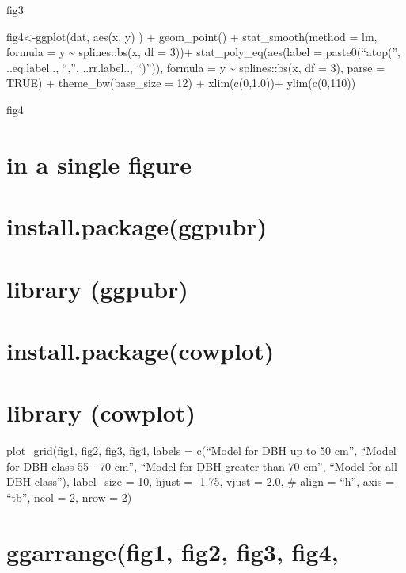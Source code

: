 \documentclass[
]{article}
\begin{document}
fig3

fig4\textless-ggplot(dat, aes(x, y) ) + geom\_point() +
stat\_smooth(method = lm, formula = y \textasciitilde{} splines::bs(x,
df = 3))+ stat\_poly\_eq(aes(label = paste0(``atop('', ..eq.label..,
``,'', ..rr.label.., ``)'')), formula = y \textasciitilde{}
splines::bs(x, df = 3), parse = TRUE) + theme\_bw(base\_size = 12) +
xlim(c(0,1.0))+ ylim(c(0,110))

fig4

\hypertarget{in-a-single-figure}{%
\section{in a single figure}\label{in-a-single-figure}}

\hypertarget{install.packageggpubr}{%
\section{install.package(ggpubr)}\label{install.packageggpubr}}

\hypertarget{library-ggpubr}{%
\section{library (ggpubr)}\label{library-ggpubr}}

\hypertarget{install.packagecowplot}{%
\section{install.package(cowplot)}\label{install.packagecowplot}}

\hypertarget{library-cowplot}{%
\section{library (cowplot)}\label{library-cowplot}}

plot\_grid(fig1, fig2, fig3, fig4, labels = c(``Model for DBH up to 50
cm'', ``Model for DBH class 55 - 70 cm'', ``Model for DBH greater than
70 cm'', ``Model for all DBH class''), label\_size = 10, hjust = -1.75,
vjust = 2.0, \# align = ``h'', axis = ``tb'', ncol = 2, nrow = 2)

\hypertarget{ggarrangefig1-fig2-fig3-fig4}{%
\section{ggarrange(fig1, fig2, fig3,
fig4,}\label{ggarrangefig1-fig2-fig3-fig4}}
\end{document}
